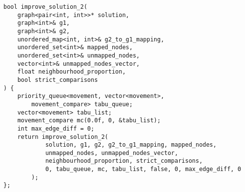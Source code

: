 \begin{lstlisting}
bool improve_solution_2(
    graph<pair<int, int>>* solution,
    graph<int>& g1,
    graph<int>& g2,
    unordered_map<int, int>& g2_to_g1_mapping,
    unordered_set<int>& mapped_nodes,
    unordered_set<int>& unmapped_nodes,
    vector<int>& unmapped_nodes_vector,
    float neighbourhood_proportion,
    bool strict_comparisons
) {
    priority_queue<movement, vector<movement>,
        movement_compare> tabu_queue;
    vector<movement> tabu_list;
    movement_compare mc(0.0f, 0, &tabu_list);
    int max_edge_diff = 0;
    return improve_solution_2(
            solution, g1, g2, g2_to_g1_mapping, mapped_nodes,
            unmapped_nodes, unmapped_nodes_vector,
            neighbourhood_proportion, strict_comparisons,
            0, tabu_queue, mc, tabu_list, false, 0, max_edge_diff, 0
        );
};
\end{lstlisting}

